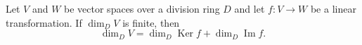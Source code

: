 Let $V$ and $W$ be vector spaces over a division ring $D$ and let $f: V \to W$ be a linear transformation. If $\dim_D V$ is finite, then
\[
\dim_D V = \dim_D \operatorname{Ker} f + \dim_D \operatorname{Im} f.
\]
